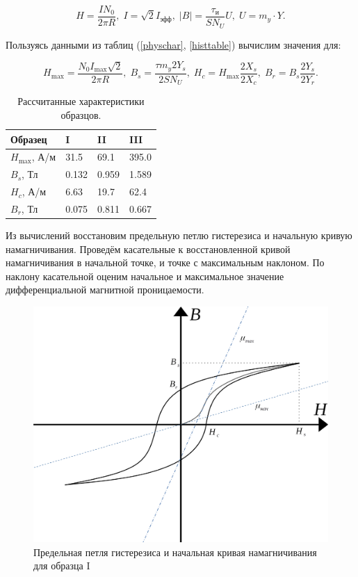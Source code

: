 \documentclass[a4paper,12pt]{article} %
\begin{document}
\[ H = \frac{IN_0}{2 \pi R}, \; I = \sqrt{2} I_\text{эфф}, \; |B| = \frac{\tau_\text{и}}{SN_U} U, \; U = m_y \cdot Y. \]

Пользуясь данными из таблиц (\ref{physchar}, \ref{histtable}) вычислим значения для:

\[ H_{\max} = \frac{N_0 I_{\max} \sqrt{2}}{2 \pi R}, \; B_s = \frac{\tau m_y 2Y_s}{2SN_U}, \; H_c = H_{\max} \frac{2X_s}{2X_c}, \; B_r = B_s \frac{2Y_s}{2Y_r}.
\]

\begin{table}[h]
\begin{center}
\begin{tabularx}{0.8\textwidth}{|l|X|X|X|}
\hline
Образец & I & II & III \\ \hline
$H_{\max}$, А/м & 31.5 & 69.1 & 395.0 \\ \hline
$B_s$, Тл & 0.132 & 0.959 & 1.589 \\ \hline
$H_c$, А/м & 6.63 & 19.7 & 62.4 \\ \hline
$B_r$, Тл & 0.075 & 0.811 & 0.667 \\ \hline
\end{tabularx}
\caption{Рассчитанные характеристики образцов.}
\end{center}
\end{table}


Из вычислений восстановим предельную петлю гистерезиса и начальную кривую намагничивания. Проведём касательные к восстановленной кривой намагничивания в начальной точке, и точке с максимальным наклоном. По наклону касательной оценим начальное и максимальное значение дифференциальной магнитной проницаемости.

\begin{figure}
\begin{center}
\includegraphics[width=5in]{hist graph 1.png}
\caption{Предельная петля гистерезиса и начальная кривая намагничивания для образца I} 
\label{hist1}
\end{center}
\end{figure}
\end{document}

